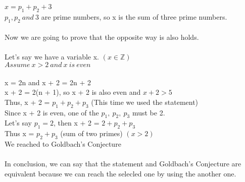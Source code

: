 \documentclass[12pt]{article}
\begin{document}
$x = p_1 + p_2 + 3$\\
$p_1, p_2\ and\ 3$ are prime numbers, so x is the sum of three prime numbers.\\
\\
Now we are going to prove that the opposite way is also holds.\\
\\
Let's say we have a variable x. $(x \in \mathbb{Z})$\\
$Assume\ x > 2\ and \ x\ is\ even$\\
\\
x = 2n and x + 2 = 2n + 2\\
x + 2 = 2(n + 1), so x + 2 is also even and $x + 2 > 5$\\ 
Thus, x + 2 = $ p_1 + p_2 + p_3$ (This time we used the statement)\\
Since x + 2 is even, one of the $ p_1,\ p_2,\  p_3$ must be 2.\\
Let's say $p_1 = 2$, then x + 2 = $ 2 + p_2 + p_3$\\
Thus x = $p_2 + p_3$ (sum of two primes) $(x > 2)$\\
We reached to Goldbach's Conjecture\\
\\
In conclusion, we can say that the statement and Goldbach's Conjecture are equivalent because we can reach the selecled one by using the another one.\\ 
\end{document}
